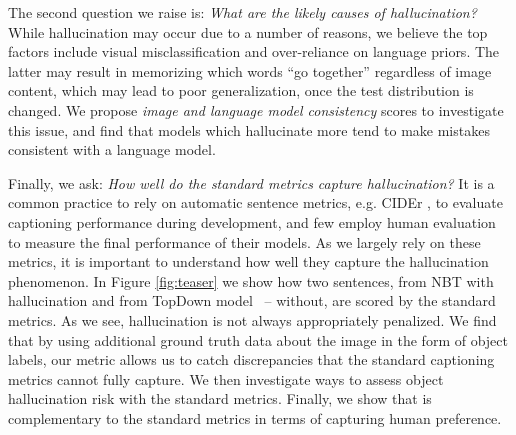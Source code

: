 The second question we raise is: \emph{What are the likely causes of hallucination?} %
While hallucination may occur due to a number of reasons, we believe the top factors include visual misclassification and over-reliance on language priors. The latter may result in memorizing which words ``go together'' regardless of image content, which may lead to poor generalization, once the test distribution is changed. We propose \emph{image and language model consistency} scores to investigate this issue, %
and find that models which hallucinate more tend to make mistakes consistent with a language model.%

Finally, we ask: \emph{How well do the standard metrics capture hallucination?} It is a common practice to rely on automatic sentence metrics, e.g. CIDEr \cite{cider}, to evaluate  captioning performance during development, and few employ human evaluation to measure the final performance of their models. As we largely rely on these metrics, it is important to understand how well they capture the hallucination phenomenon. In Figure \ref{fig:teaser} we show how two sentences, from NBT with hallucination and from TopDown model~\cite{anderson2017bottom} -- without, are scored by the standard metrics. As we see, hallucination is not always appropriately penalized. We find that by using additional ground truth data about the image in the form of object labels, our metric \metric{} allows us to catch discrepancies that the standard captioning metrics cannot fully capture. We then investigate ways to assess object hallucination risk with the standard metrics. Finally, we show that \metric{} is complementary to the standard metrics in terms of capturing human preference.

%
%
%
%

%
%
%
%
%
%
%
%
%

%
%
%
%
%


%

%
%

%
%
%
%
%
%
%

%
%

%
%
%
%

